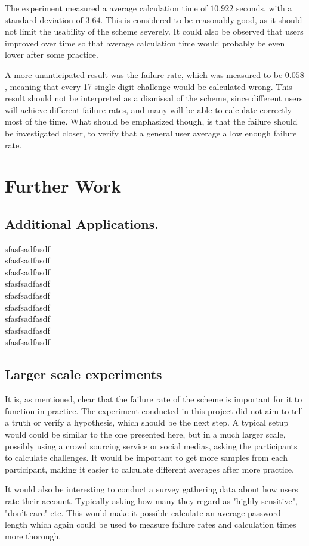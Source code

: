 \par The experiment measured a average calculation time of $10.922$ seconds, with a standard deviation of $3.64$. This is considered to be reasonably good, as it should not limit the usability of the scheme severely. It could also be observed that users improved over time so that average calculation time would probably be even lower after some practice. 
\par A more unanticipated result was the failure rate, which was measured to be $0.058$, meaning that every 17 single digit challenge would be calculated wrong. This result should not be interpreted as a dismissal of the scheme, since different users will achieve different failure rates, and many will be able to calculate correctly most of the time. What should be emphasized though, is that the failure should be investigated closer, to verify that a general user average a low enough failure rate. 


\section{Further Work}

\subsection{Additional Applications.}
sfasfsadfasdf\\
sfasfsadfasdf\\
sfasfsadfasdf\\
sfasfsadfasdf\\
sfasfsadfasdf\\
sfasfsadfasdf\\
sfasfsadfasdf\\
sfasfsadfasdf\\
sfasfsadfasdf\\

\subsection{Larger scale experiments}
It is, as mentioned, clear that the failure rate of the scheme is important for it to function in practice. The experiment conducted in this project did not aim to tell a truth or verify a hypothesis, which should be the next step. A typical setup would could be similar to the one presented here, but in a much larger scale, possibly using a crowd sourcing service or social medias, asking the participants to calculate challenges. It would be important to get more samples from each participant, making it easier to calculate different averages after more practice.  
\par It would also be interesting to conduct a survey gathering data about how users rate their account. Typically asking how many they regard as "highly sensitive", "don't-care" etc. This would make it possible calculate an average password length which again could be used to measure failure rates and calculation times more thorough. 
